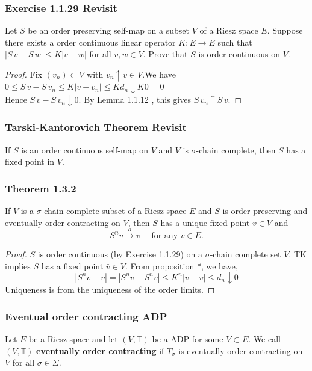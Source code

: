 \documentclass[11pt,xcolor={dvipsnames},hyperref={pdftex,pdfpagemode=UseNone,hidelinks,pdfdisplaydoctitle=true},usepdftitle=false]{beamer}
\newcommand{\too}{\stackrel { o } {\to} }
\begin{document}
\begin{frame}
\frametitle{Exercise 1.1.29 Revisit}
Let $S$ be an order preserving self-map on a subset $V$ of a Riesz space $E$.  Suppose there exists a
    order continuous linear operator $K \colon E \to E$ such that 
    $|S \,v - S \, w| \leq K |v - w|$ for all $v, w \in V$. Prove that $S$ is 
    order continuous on $V$.
\begin{proof}
Fix $(v_n) \subset V$ with $v_n \uparrow v \in V$.We have\\
$0 \leq S \, v - S \, v_n \leq K |v - v_n|\le Kd_n\downarrow K0=0$\\
Hence $S \, v - S \, v_n \downarrow
    0$.  By Lemma 1.1.12 , this gives $S \, v_n \uparrow S \, v$.
\end{proof}
\end{frame}
\begin{frame}
\frametitle{Tarski-Kantorovich Theorem Revisit}
\begin{theorem}
If $S$ is an order continuous self-map on $V$ 
    and $V$ is $\sigma$-chain complete, then  $S$ has a fixed point in $V$.
\end{theorem}
\end{frame}
\begin{frame}
\frametitle{Theorem 1.3.2}
If $V$ is a $\sigma$-chain complete subset of a Riesz space $E$ and
    $S$ is order preserving and eventually order contracting on $V$, then
    $S$ has a unique fixed point $\bar v \in V$ and
    \begin{equation*}\label{eq:snoc}
        S^n v \too \bar v 
        \quad \text{ for any }
        v \in E. 
    \end{equation*}
\begin{proof}
$S$ is order continuous (by Exercise 1.1.29) on a $\sigma$-chain complete set $V$. TK implies $S$ has a fixed point $\bar v\in V$. From proposition *, we have,
$$
|S^nv-\bar v|= |S^{n}v-S^n\bar v| \le K^n|v-\bar v|\le d_n\downarrow 0
$$
Uniqueness is from the uniqueness of the order limits.
\end{proof}
\end{frame}
\begin{frame}
\frametitle{Eventual order contracting  ADP}
\begin{definition}
Let $E$ be a Riesz space and let $(V, \mathbb{T})$ be
a ADP for some $V \subset E$. We call $(V, \mathbb{T})$ \textbf{eventually order
contracting} if $T_\sigma$ is eventually order contracting on $V$ for all
$\sigma \in \Sigma$.
\end{definition}
\end{frame}
\end{document}
